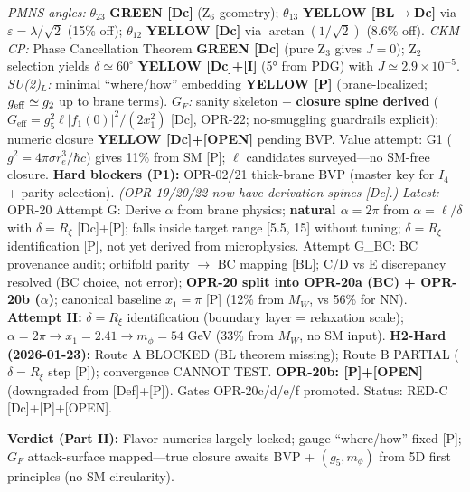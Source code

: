 \begin{tcolorbox}[breakable, enhanced, colback=white, colframe=black, boxrule=0.5pt,
    title={\textbf{Part II (Weak Sector) --- Status Map (as of 2026-01-22)}}, width=\linewidth]
\small
\textit{PMNS angles:} $\theta_{23}$ \textbf{GREEN [Dc]} (Z$_6$ geometry);
$\theta_{13}$ \textbf{YELLOW [BL$\to$Dc]} via $\varepsilon=\lambda/\sqrt{2}$ (15\% off);
$\theta_{12}$ \textbf{YELLOW [Dc]} via $\arctan(1/\sqrt{2})$ (8.6\% off).
\textit{CKM CP:} Phase Cancellation Theorem \textbf{GREEN [Dc]} (pure Z$_3$ gives $J=0$);
Z$_2$ selection yields $\delta\simeq60^\circ$ \textbf{YELLOW [Dc]+[I]} (5° from PDG) with $J\simeq2.9\times10^{-5}$.
\textit{SU(2)$_L$:} minimal ``where/how'' embedding \textbf{YELLOW [P]} (brane-localized; $g_{\rm eff}\simeq g_2$ up to brane terms).
\textit{$G_F$:} sanity skeleton + \textbf{closure spine derived} ($G_{\text{eff}} = g_5^2 \ell |f_1(0)|^2/(2x_1^2)$ [Dc], OPR-22; no-smuggling guardrails explicit); numeric closure \textbf{YELLOW [Dc]+[OPEN]} pending BVP.
Value attempt: G1 ($g^2 = 4\pi\sigma r_e^3/\hbar c$) gives 11\% from SM [P]; $\ell$ candidates surveyed---no SM-free closure.
\textbf{Hard blockers (P1):} OPR-02/21 thick-brane BVP (master key for $I_4$ + parity selection). \textit{(OPR-19/20/22 now have derivation spines [Dc].)}
\textit{Latest:} OPR-20 Attempt G: Derive $\alpha$ from brane physics; \textbf{natural $\alpha = 2\pi$} from $\alpha = \ell/\delta$ with $\delta = R_\xi$ [Dc]+[P]; falls inside target range [5.5, 15] without tuning; $\delta = R_\xi$ identification [P], not yet derived from microphysics. Attempt G\_BC: BC provenance audit; orbifold parity $\to$ BC mapping [BL]; C/D vs E discrepancy resolved (BC choice, not error); \textbf{OPR-20 split into OPR-20a (BC) + OPR-20b ($\alpha$)}; canonical baseline $x_1 = \pi$ [P] (12\% from $M_W$, vs 56\% for NN). \textbf{Attempt H:} $\delta = R_\xi$ identification (boundary layer = relaxation scale); $\alpha = 2\pi \to x_1 = 2.41 \to m_\phi = 54$ GeV (33\% from $M_W$, no SM input). \textbf{H2-Hard (2026-01-23):} Route A BLOCKED (BL theorem missing); Route B PARTIAL ($\delta = R_\xi$ step [P]); convergence CANNOT TEST. \textbf{OPR-20b: [P]+[OPEN]} (downgraded from [Def]+[P]). Gates OPR-20c/d/e/f promoted. Status: RED-C [Dc]+[P]+[OPEN].

\medskip
\textbf{Verdict (Part II):} Flavor numerics largely locked; gauge ``where/how'' fixed [P]; $G_F$ attack-surface mapped---true closure awaits BVP + $(g_5,m_\phi)$ from 5D first principles (no SM-circularity).
\end{tcolorbox}

